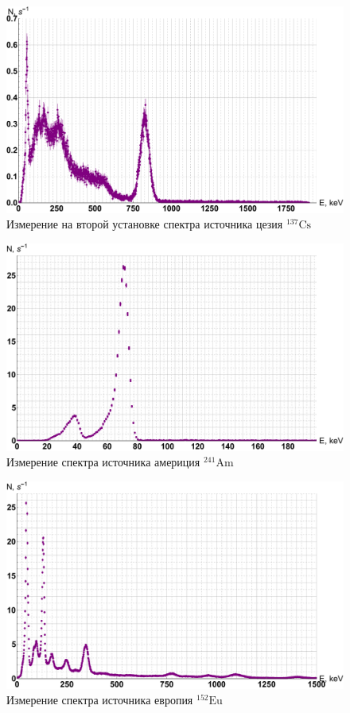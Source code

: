 \documentclass[12pt]{kiarticle}
\begin{document}
\begin{figure}[H]
	\label{graf_cs2}
	\includegraphics[scale=0.5]{cs2.pdf}
	\caption{Измерение на второй установке спектра источника цезия $ \mathrm{^{137}Cs} $} 
\end{figure} 

\begin{figure}[H]
	\label{graf_am}
	\includegraphics[scale=0.5]{am.pdf}
	\caption{Измерение спектра источника америция $ \mathrm{^{241}Am} $}
\end{figure} 

\begin{figure}[H]
	\label{graf_eu}
	\includegraphics[scale=0.5]{eu.pdf}
	\caption{Измерение спектра источника европия $ \mathrm{^{152}Eu} $}
\end{figure} 
	
\end{document}
